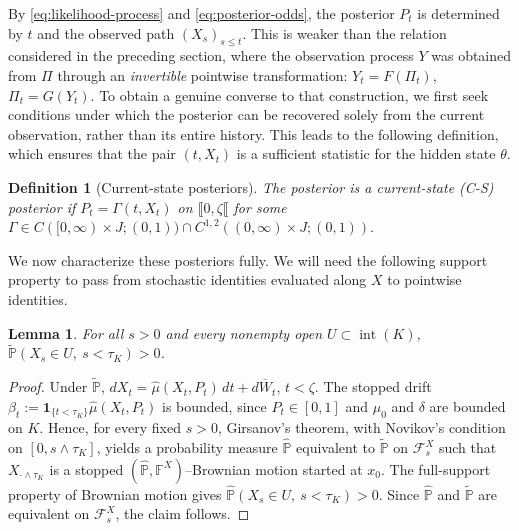 \documentclass[11pt, reqno]{amsart}
\theoremstyle{plain}
\newtheorem{lemma}[theorem]{Lemma}
\newtheorem{definition}[theorem]{Definition}
\theoremstyle{remark}
\numberwithin{equation}{section}
\begin{document}
By \eqref{eq:likelihood-process} and \eqref{eq:posterior-odds}, the posterior $P_t$ is determined by $t$ and the observed path $(X_s)_{s\leq t}$. This is weaker than the relation considered in the preceding section, where the observation process $Y$ was obtained from $\Pi$ through an \emph{invertible} pointwise transformation: $Y_t=F(\Pi_t)$, $\Pi_t = G(Y_t)$. To obtain a genuine converse to that construction, we first seek conditions under which the posterior can be recovered solely from the current observation, rather than its entire history. This leads to the following definition, which ensures that the pair $(t,X_t)$ is a sufficient statistic for the hidden state $\theta$.

\begin{definition}[Current-state posteriors]\label{def:current-state}
The posterior is a \emph{current-state (C-S) posterior} if $P_t=\Gamma(t,X_t)$ on $\llbracket 0,\zeta\llbracket$ for some
\(
  \Gamma\in C([0,\infty)\times J;(0,1))\cap C^{1,2}((0,\infty)\times J;(0,1)).
\)
\end{definition}

We now characterize these posteriors fully. We will need the following support property to pass from stochastic identities evaluated along $X$ to pointwise identities.

\begin{lemma}
\label{lem:stopped-full-support}
    For all $s>0$ and every nonempty open $U\subset\operatorname{int}(K)$, $\widetilde{\mathbb P}(X_s\in U,\ s<\tau_K)>0$.
\end{lemma}

\begin{proof}
    Under $\widetilde{\mathbb P}$, $dX_t=\widehat{\mu}(X_t,P_t)\,dt+d\overline W_t$, $t<\zeta$.
    The stopped drift $\beta_t:=\mathbf 1_{\{t<\tau_K\}}\widehat{\mu}(X_t,P_t)$ is bounded, since $P_t\in[0,1]$ and $\mu_0$ and $\delta$ are bounded on $K$. Hence, for every fixed $s>0$, Girsanov's theorem, with Novikov's condition on $[0,s\wedge\tau_K]$, yields a probability measure $\widehat{\mathbb P}$ equivalent to $\widetilde{\mathbb P}$ on $\mathcal F^X_s$ such that $X_{\cdot\wedge\tau_K}$ is a stopped $(\widehat{\mathbb{P}},\mathbb F^X)$--Brownian motion started at $x_0$. The full-support property of Brownian motion gives $ \widehat{\mathbb P}(X_s\in U,\ s<\tau_K)>0$.
    Since $\widehat{\mathbb P}$ and $\widetilde{\mathbb P}$ are equivalent on $\mathcal F^X_s$, the claim follows.
\end{proof}
\end{document}
